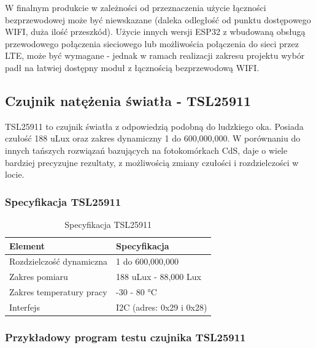 \documentclass[12pt,a4paper]{article}
\begin{document}
\noindent W finalnym produkcie w zależności od przeznaczenia użycie łączności bezprzewodowej może być niewskazane (daleka odległość od punktu dostępowego WIFI, duża ilość przeszkód).
Użycie innych wersji ESP32 z wbudowaną obsługą przewodowego połączenia sieciowego lub możliwościa połączenia do sieci przez LTE, może być wymagane - jednak
w ramach realizacji zakresu projektu wybór padł na łatwiej dostępny moduł z łącznością bezprzewodową WIFI.  

\subsection{Czujnik natężenia światła - TSL25911}

TSL25911 to czujnik światła z odpowiedzią podobną do ludzkiego oka. Posiada czułość 188 uLux oraz zakres dynamiczny 1 do 600,000,000.
W porównaniu do innych tańszych rozwiązań bazujących na fotokomórkach CdS, daje o wiele bardziej precyzujne rezultaty, z możliwością zmiany czułości i
rozdzielczości w locie. 

\subsubsection{Specyfikacja TSL25911}

\begin{table}[H]
    \centering
    \begin{tabular}{|l|l|}
        \hline
        Element & Specyfikacja \\
        \hline
        Rozdzielczość dynamiczna & 1 do 600,000,000 \\
        \hline
        Zakres pomiaru & 188 uLux - 88,000 Lux \\
        \hline
        Zakres temperatury pracy & -30 - 80 °C \\
        \hline
        Interfejs & I2C (adres: 0x29 i 0x28)\\
        \hline
    \end{tabular}
    \caption{Specyfikacja TSL25911}
    \label{tsl25911-spec}
\end{table}

\subsubsection{Przykładowy program testu czujnika TSL25911}

\begin{code}[H]
\inputminted[frame=lines,baselinestretch=1,breaklines,linenos,xleftmargin=1.5em]{c}{../proj/tsl2591-test/tsl2591-test.ino}

\caption{Test czujnika TSL25911}
\end{code}
\end{document}
